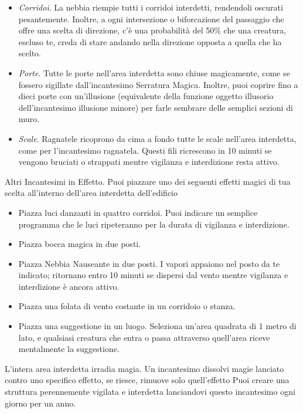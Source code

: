 \begin{multicols}{2}
\begin{itemize}[leftmargin=*]
	\item \emph{Corridoi}. La nebbia riempie tutti i corridoi interdetti, rendendoli oscurati pesantemente. Inoltre, a ogni intersezione o biforcazione del passaggio che offre una scelta di direzione, c'è una probabilità del 50\% che una creatura, escluso te, creda di stare andando nella direzione opposta a quella che ha scelto.
	\item \emph{Porte}. Tutte le porte nell'area interdetta sono chiuse magicamente, come se fossero sigillate dall'incantesimo Serratura Magica. Inoltre, puoi coprire fino a dieci porte con un'illusione (equivalente della funzione oggetto illusorio dell'incantesimo illusione minore) per farle sembrare delle semplici sezioni di muro.
	\item \emph{Scale}. Ragnatele ricoprono da cima a fondo tutte le scale nell'area interdetta, come per l'incantesimo ragnatela. Questi fili ricrescono in 10 minuti se vengono bruciati o strappati mentre vigilanza e interdizione resta attivo.
\end{itemize}

Altri Incantesimi in Effetto. Puoi piazzare uno dei seguenti effetti magici di tua scelta all'interno dell'area interdetta dell'edificio

\begin{itemize}[leftmargin=*] \setlength{\itemsep}{0pt}
	\item Piazza luci danzanti in quattro corridoi. Puoi indicare un semplice programma che le luci ripeteranno per la durata di vigilanza e interdizione.
	\item Piazza bocca magica in due posti.
	\item Piazza Nebbia Nauseante in due posti. I vapori appaiono nel posto da te indicato; ritornano entro 10 minuti se dispersi dal vento mentre vigilanza e interdizione è ancora attivo.
	\item Piazza una folata di vento costante in un corridoio o stanza.
	\item Piazza una suggestione in un luogo. Seleziona un'area quadrata di 1 metro di lato, e qualsiasi creatura che entra o passa attraverso quell'area riceve mentalmente la suggestione.
\end{itemize}

L'intera area interdetta irradia magia. Un incantesimo dissolvi magie lanciato contro uno specifico effetto, se riesce, rimuove solo quell'effetto Puoi creare una struttura perennemente vigilata e interdetta lanciandovi questo incantesimo ogni giorno per un anno.


\end{multicols}
